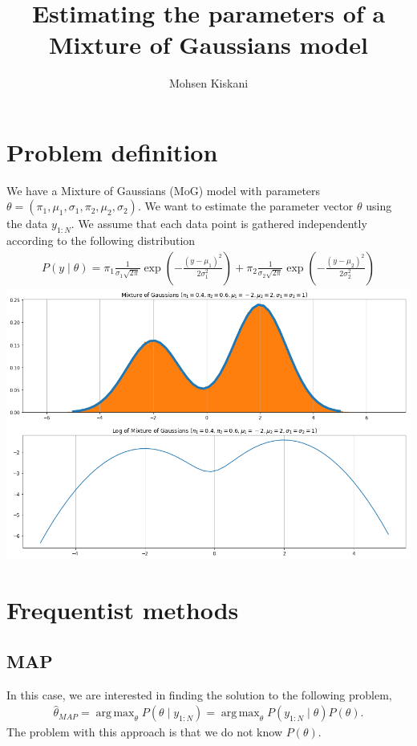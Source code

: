 \documentclass[10pt ]{article}
\DeclareMathOperator*{\argmaxA}{arg\,max}
\begin{document}
\title{Estimating the parameters of a Mixture of Gaussians model}

\author{Mohsen Kiskani}

\maketitle


\section{Problem definition}

We have a Mixture of Gaussians (MoG) model with parameters $\theta = (\pi_1, \mu_1, \sigma_1, \pi_2, \mu_2, \sigma_2)$. We want to estimate the parameter vector $\theta$ using the data $y_{1:N}$.
We assume that each data point is gathered independently according to the following distribution
\begin{align}
P(y \mid \theta) = \pi_1 \frac{1}{\sigma_1 \sqrt{2 \pi}} \exp \left( -\frac{(y-\mu_1)^2}{2\sigma_1^2}\right) + \pi_2 \frac{1}{\sigma_2 \sqrt{2 \pi}} \exp \left( -\frac{(y-\mu_2)^2}{2\sigma_2^2}\right) 
\end{align}
\includegraphics[height=0.7\textwidth]{mog.png}
\section{Frequentist methods}

\subsection{MAP}
In this case, we are interested in finding the solution to the following problem,
\begin{align}
\hat{\theta}_{MAP} = \argmaxA_{\theta} P(\theta \mid y_{1:N}) =  \argmaxA_{\theta} P(y_{1:N} \mid \theta) P(\theta). 
\end{align}
The problem with this approach is that we do not know $P(\theta)$. 
\end{document}
